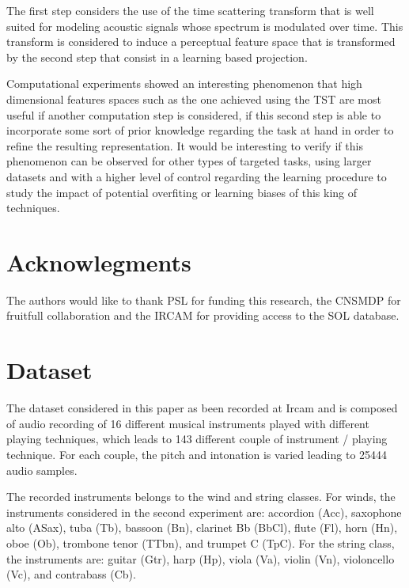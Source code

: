 \documentclass{article}
\begin{document}
The first step considers the use of the time scattering transform that is well suited for modeling acoustic signals whose spectrum is modulated over time. This transform is considered to induce a perceptual feature space that is transformed by the second step that consist in a learning based projection.

Computational experiments showed an interesting phenomenon that high dimensional features spaces such as the one achieved using the TST are most useful if another computation step is considered, if this second step is able to incorporate some sort of prior knowledge regarding the task at hand in order to refine the resulting representation. It would be interesting to verify if this phenomenon can be observed for other types of targeted tasks, using larger datasets and with a higher level of control regarding the learning procedure to study the impact of potential overfiting or learning biases of this king of techniques.

\section*{Acknowlegments}

The authors would like to thank PSL for funding this research, the CNSMDP for fruitfull collaboration and the IRCAM for providing access to the SOL database.




\section{Dataset} \label{sec:dataset}

The dataset considered in this paper as been recorded at Ircam and is composed of audio recording of 16 different musical instruments played with different playing techniques, which leads to 143 different couple of instrument / playing technique. For each couple, the pitch and intonation is varied leading to 25444 audio samples.

The recorded instruments belongs to the wind and string classes. For winds, the instruments considered in the second experiment are: accordion (Acc), saxophone alto (ASax), tuba (Tb), bassoon (Bn), clarinet Bb (BbCl), flute (Fl), horn (Hn), oboe (Ob), trombone tenor (TTbn), and trumpet C (TpC). For the string class, the instruments are: guitar (Gtr), harp (Hp), viola (Va), violin (Vn), violoncello (Vc), and contrabass (Cb).
\end{document}
